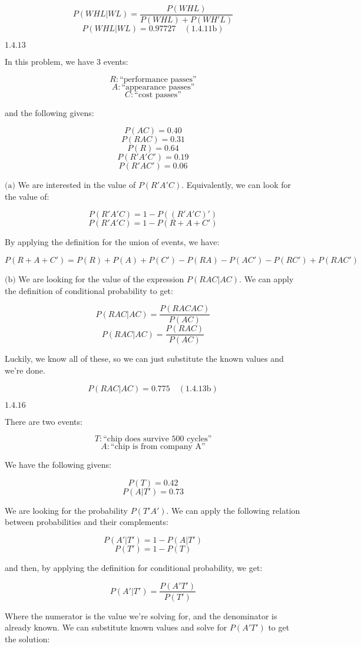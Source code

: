 \documentclass{article}
\newcommand{\problem}[2]{$\boxed{\text{#1.#2}}$}
\newcommand{\subproblem}[3]{$\boxed{\text{(#3)}}$}
\newcommand{\subsolution}[4]{\boxed{#4\quad(\text{#1.#2#3})}}
\begin{document}
\[
P(WHL|WL)=\dfrac{P(WHL)}{P(WHL)+P(WH'L)}
\] \[
\subsolution{1.4}{11}{b}{P(WHL|WL)=0.97727}
\]

%
\problem{1.4}{13}

In this problem, we have 3 events:

\[
R:\text{``performance passes''}
\] \[
A:\text{``appearance passes''}
\] \[
C:\text{``cost passes''}
\]

and the following givens:

\[
P(AC)=0.40
\] \[
P(RAC)=0.31
\] \[
P(R)=0.64
\] \[
P(R'A'C')=0.19
\] \[
P(R'AC')=0.06
\]

%
\subproblem{1.4}{13}{a} We are interested in the value of
$P(R'A'C)$. Equivalently, we can look for the value of:

\[
P(R'A'C)=1-P((R'A'C)')
\] \[
P(R'A'C)=1-P(R+A+C')
\]

By applying the definition for the union of events, we have:

\[
P(R+A+C')=P(R)+P(A)+P(C')-P(RA)-P(AC')-P(RC')+P(RAC')
\]

%
\subproblem{1.4}{13}{b} We are looking for the value of the expression
$P(RAC|AC)$. We can apply the definition of conditional probability to
get:

\[
P(RAC|AC)=\dfrac{P(RACAC)}{P(AC)}
\] \[
P(RAC|AC)=\dfrac{P(RAC)}{P(AC)}
\]

Luckily, we know all of these, so we can just substitute the known
values and we're done.

\[
\subsolution{1.4}{13}{b}{P(RAC|AC)=0.775}
\]

%
\problem{1.4}{16}

There are two events:

\[
T:\text{``chip does survive 500 cycles''}
\] \[
A:\text{``chip is from company A''}
\]

We have the following givens:

\[
P(T)=0.42
\] \[
P(A|T')=0.73
\]

We are looking for the probability $P(T'A')$. We can apply the
following relation between probabilities and their complements:

\[
P(A'|T')=1-P(A|T')
\] \[
P(T')=1-P(T)
\]

and then, by applying the definition for conditional probability, we
get:

\[
P(A'|T')=\dfrac{P(A'T')}{P(T')}
\]

Where the numerator is the value we're solving for, and the
denominator is already known. We can substitute known values and solve
for $P(A'T')$ to get the solution:
\end{document}
